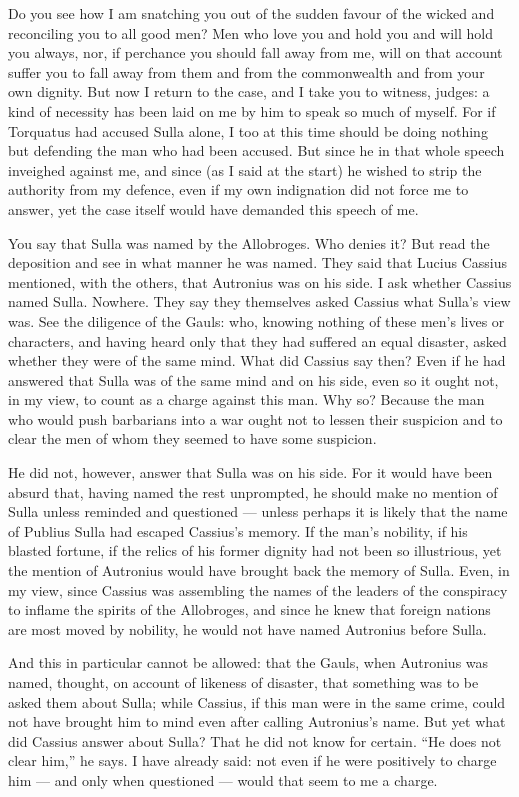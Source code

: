  Do you see how I am snatching you out of the sudden favour of the wicked and reconciling you to all good men? Men who love you and hold you and will hold you always, nor, if perchance you should fall away from me, will on that account suffer you to fall away from them and from the commonwealth and from your own dignity. But now I return to the case, and I take you to witness, judges: a kind of necessity has been laid on me by him to speak so much of myself. For if Torquatus had accused Sulla alone, I too at this time should be doing nothing but defending the man who had been accused. But since he in that whole speech inveighed against me, and since (as I said at the start) he wished to strip the authority from my defence, even if my own indignation did not force me to answer, yet the case itself would have demanded this speech of me.

 You say that Sulla was named by the Allobroges. Who denies it? But read the deposition and see in what manner he was named. They said that Lucius Cassius mentioned, with the others, that Autronius was on his side. I ask whether Cassius named Sulla. Nowhere. They say they themselves asked Cassius what Sulla's view was. See the diligence of the Gauls: who, knowing nothing of these men's lives or characters, and having heard only that they had suffered an equal disaster, asked whether they were of the same mind. What did Cassius say then? Even if he had answered that Sulla was of the same mind and on his side, even so it ought not, in my view, to count as a charge against this man. Why so? Because the man who would push barbarians into a war ought not to lessen their suspicion and to clear the men of whom they seemed to have some suspicion.

 He did not, however, answer that Sulla was on his side. For it would have been absurd that, having named the rest unprompted, he should make no mention of Sulla unless reminded and questioned --- unless perhaps it is likely that the name of Publius Sulla had escaped Cassius's memory. If the man's nobility, if his blasted fortune, if the relics of his former dignity had not been so illustrious, yet the mention of Autronius would have brought back the memory of Sulla. Even, in my view, since Cassius was assembling the names of the leaders of the conspiracy to inflame the spirits of the Allobroges, and since he knew that foreign nations are most moved by nobility, he would not have named Autronius before Sulla.

 And this in particular cannot be allowed: that the Gauls, when Autronius was named, thought, on account of likeness of disaster, that something was to be asked them about Sulla; while Cassius, if this man were in the same crime, could not have brought him to mind even after calling Autronius's name. But yet what did Cassius answer about Sulla? That he did not know for certain. ``He does not clear him,'' he says. I have already said: not even if he were positively to charge him --- and only when questioned --- would that seem to me a charge.

